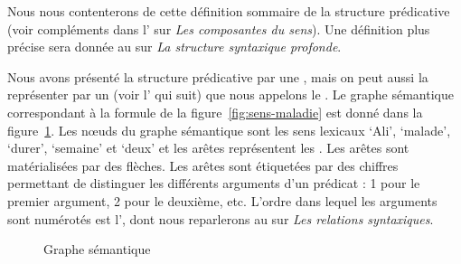 Nous nous contenterons de cette définition sommaire de la structure prédicative (voir compléments dans l’ sur \textit{Les composantes du sens}). Une définition plus précise sera donnée au  sur \textit{La structure syntaxique profonde}.

Nous avons présenté la structure prédicative par une , mais on peut aussi la représenter par un  (voir l’ qui suit) que nous appelons le . Le graphe sémantique correspondant à la formule de la figure~\ref{fig:sens-maladie} est donné dans la figure~\ref{fig:graphe-maladie}. Les nœuds du graphe sémantique sont les sens lexicaux ‘Ali’, ‘malade’, ‘durer’, ‘semaine’ et ‘deux’ et les arêtes représentent les . Les arêtes sont matérialisées par des flèches. Les arêtes sont étiquetées par des chiffres permettant de distinguer les différents arguments d’un prédicat : 1 pour le premier argument, 2 pour le deuxième, etc. L’ordre dans lequel les arguments sont numérotés est l’, dont nous reparlerons au  sur \textit{Les relations syntaxiques}.

\begin{figure}
\caption{\label{fig:graphe-maladie}Graphe sémantique}
\end{figure}

